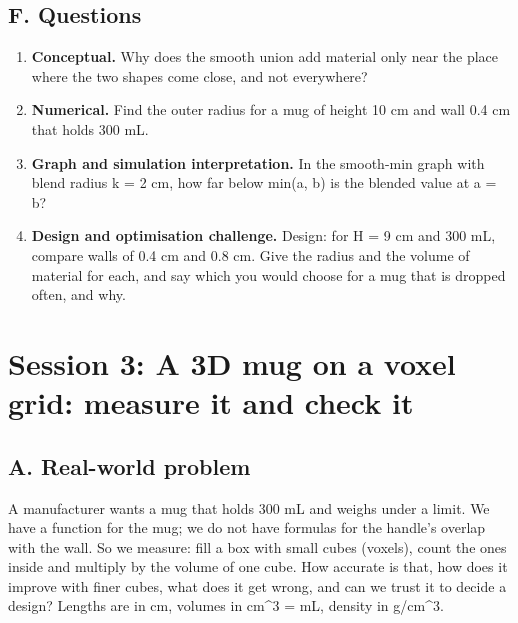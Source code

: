 \documentclass[11pt,a4paper]{article}
\begin{document}
\subsection*{F. Questions}
\begin{enumerate}[nosep]
\item \textbf{Conceptual.} Why does the smooth union add material only near the place where the two shapes come close, and not everywhere?
\item \textbf{Numerical.} Find the outer radius for a mug of height 10 cm and wall 0.4 cm that holds 300 mL.
\item \textbf{Graph and simulation interpretation.} In the smooth-min graph with blend radius k = 2 cm, how far below min(a, b) is the blended value at a = b?
\item \textbf{Design and optimisation challenge.} Design: for H = 9 cm and 300 mL, compare walls of 0.4 cm and 0.8 cm. Give the radius and the volume of material for each, and say which you would choose for a mug that is dropped often, and why.
\end{enumerate}

\section{Session 3: A 3D mug on a voxel grid: measure it and check it}

\subsection*{A. Real-world problem}
A manufacturer wants a mug that holds 300 mL and weighs under a limit. We have a function for the mug; we do not have formulas for the handle's overlap with the wall. So we measure: fill a box with small cubes (voxels), count the ones inside and multiply by the volume of one cube. How accurate is that, how does it improve with finer cubes, what does it get wrong, and can we trust it to decide a design? Lengths are in cm, volumes in cm\textasciicircum{}3 = mL, density in g/cm\textasciicircum{}3.
\end{document}
